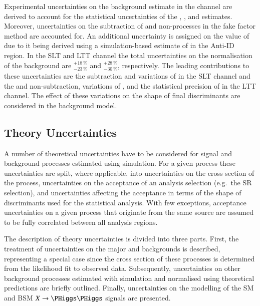 Experimental uncertainties on the \faketauhadvis background estimate in the
\lephad channel are derived to account for the statistical uncertainties of the
\FFqcd, \FFttbar, and \rqcd estimates. Moreover, uncertainties on the
subtraction of \ttbar and non-\ttbar processes in the fake factor method are
accounted for. An additional uncertainty is assigned on the value of \rqcd due
to it being derived using a simulation-based estimate of \ttbarFakes in the
Anti-ID region. In the \lephad SLT and LTT channel the total uncertainties on
the normalisation of the \faketauhadvis background are $^{+18\,\%}_{-23\,\%}$
and $^{+28\,\%}_{-30\,\%}$, respectively. The leading contributions to these
uncertainties are the \ttbar subtraction and variations of \rqcd in the SLT
channel and the \ttbar and non-\ttbar subtraction, variations of \rqcd, and the
statistical precision of \FFttbar in the LTT channel. The effect of these
variations on the shape of final discriminants are considered in the background
model.


\subsection{Theory Uncertainties}%
\label{sec:modelling_uncertainties}%
\label{sec:theory_uncertainties}

A number of theoretical uncertainties have to be considered for signal and
background processes estimated using simulation. For a given process these
uncertainties are split, where applicable, into uncertainties on the cross
section of the process, uncertainties on the acceptance of an analysis selection
(e.g.\ the SR selection), and uncertainties affecting the acceptance in terms of
the shape of discriminants used for the statistical analysis. With few
exceptions, acceptance uncertainties on a given process that originate from the
same source are assumed to be fully correlated between all analysis regions.

The description of theory uncertainties is divided into three parts.  First, the
treatment of uncertainties on the major \ZHF and \ttbar backgrounds is
described, representing a special case since the cross section of these
processes is determined from the likelihood fit to observed data. Subsequently,
uncertainties on other background processes estimated with simulation and
normalised using theoretical predictions are briefly outlined. Finally,
uncertainties on the modelling of the SM \HH and BSM $X \to \HH$ signals are
presented.

